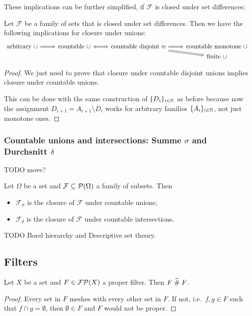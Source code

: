 These implications can be further simplified, if $\mathcal{F}$ is closed under set differences:
\begin{lemma}
Let $\mathcal{F}$ be a family of sets that is closed under set differences. Then we have the following implications for closure under unions:
\[ \begin{tikzcd}[row sep=0em]
\text{arbitrary $\cup$} \arrow[r, Rightarrow] & \text{countable $\cup$} \arrow[r, Leftrightarrow] & \text{countable disjoint $\uplus$} \arrow[r, Rightarrow] \arrow[dr, Rightarrow] & \text{countable monotone $\cup$} \\
&&& \text{finite $\cup$}
\end{tikzcd} \]
\end{lemma}
\begin{proof}
We just need to prove that closure under countable disjoint unions implies closure under countable unions.

This can be done with the same construction of $\{D_i\}_{i\in \mathbb{N}}$ as before because now the assignment $D_{i+1} = A_{i+1}\setminus D_i$ works for arbitrary families $\{A_i\}_{i\in \mathbb{N}}$, not just monotone ones.
\end{proof}

\subsubsection{Countable unions and intersections: Summe $\sigma$ and Durchsnitt $\delta$}
TODO move?

\begin{definition}
Let $\Omega$ be a set and $\mathcal{F}\subseteq \operatorname{\mathcal{P}}(\Omega)$ a family of subsets. Then
\begin{itemize}
\item $\mathcal{F}_\sigma$ is the closure of $\mathcal{F}$ under countable unions;
\item $\mathcal{F}_\delta$ is the closure of $\mathcal{F}$ under countable intersections.
\end{itemize}
\end{definition}

TODO Borel hierarchy and Descriptive set theory.

\subsection{Filters}

\begin{proposition}
Let $X$ be a set and $F\in\operatorname{\mathcal{FP}}(X)$ a proper filter. Then $F \mathrel{\widehat{\#}} F$.
\end{proposition}
\begin{proof}
Every set in $F$ meshes with every other set in $F$. If not, i.e.\ $f,g\in F$ such that $f\cap g = \emptyset$, then $\emptyset\in F$ and $F$ would not be proper.
\end{proof}

